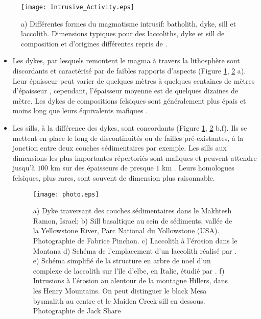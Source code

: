 \begin{figure}
  \begin{center}
    \graphicspath{ {/Users/thorey/Documents/These/Manuscript/Figure/Chapter1/} }
    \texttt{[image: Intrusive\_Activity.eps]}
    \caption{a) Différentes formes  du magmatisme intrusif: batholith,
      dyke,  sill   et  laccolith.    Dimensions  typiques   pour  des
      laccoliths,   dyke  et   sill  de   composition  et   d'origines
      différentes repris de \citet{Cruden:tg}. }
    \label{Dimension}
  \end{center}
\end{figure}

\begin{itemize}
\item  Les  dykes,  par  lesquels  remontent le  magma  à  travers  la
  lithosphère sont discordants et  caractérisé par de faibles rapports
  d'aspects (Figure \ref{Dimension}, \ref{picture} a).  Leur épaisseur
  peut  varier  de quelques  mètres  à  quelques centaines  de  mètres
  d'épaisseur      \citep{Walker:1989jq,Rubin:1995upa},     cependant,
  l'épaisseur moyenne est de quelques  dizaines de mètre. Les dykes de
  compositions felsiques  sont généralement  plus épais et  moins long
  que leurs équivalents mafiques \citep{Rubin:1995upa}.

\item Les sills,  à la différence des dykes,  sont concordants (Figure
  \ref{Dimension},  \ref{picture} b,f).   Ils se  mettent en  place le
  long de discontinuités  ou de failles pré-existantes,  à la jonction
  entre  deux  couches  sédimentaires  par  exemple.   Les  sills  aux
  dimensions les plus importantes répertoriés sont mafiques et peuvent
  attendre  jusqu'à $100$  km sur  des  épaisseurs de  presque $1$  km
  \citep{Cruden:tg}.   Leurs homologues  felsiques,  plus rares,  sont
  souvent de dimension plus raisonnable.

  \begin{figure}
    \begin{center}
      \graphicspath{ {/Users/thorey/Documents/These/Manuscript/Figure/Chapter1/} }
      \texttt{[image: photo.eps]}
      \caption{a) Dyke  traversant des  couches sédimentaires  dans le
        Makhtesh  Ramon,  Israel;  b)   Sill  basaltique  au  sein  de
        sédiments, vallée  de la  Yellowstone River, Parc  National du
        Yollowstone  (USA).   Photographie  de  Fabrice  Pinchon.   c)
        Laccolith   à  l'érosion   dans  le   Montana  d)   Schéma  de
        l'emplacement       d'un      laccolith       réalisé      par
        \citet{Gilbert:1877uk}. e) Schéma simplifié de la structure en
        arbre de noel d'un complexe  de laccolith sur l'île d'elbe, en
        Italie,  étudié par  \citet{Rocchi:2010dn}.   f) Intrusions  à
        l'érosion au alentour  de la montagne Hillers,  dans les Henry
        Mountains.   On peut  distinguer  le black  Mesa bysmalith  au
        centre et  le Maiden Creek  sill en dessous.   Photographie de
        Jack Share}
      \label{picture}
    \end{center}
  \end{figure}


\end{itemize}
